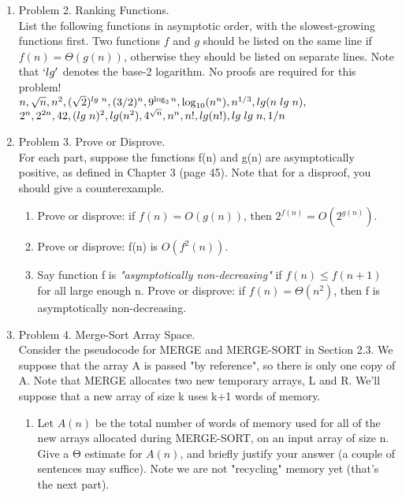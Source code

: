 \documentclass[11pt]{article}
\begin{document}
\begin{enumerate}
\item Problem 2. Ranking Functions.\\
List the following functions in asymptotic order, with the slowest-growing functions first. Two functions $f$ and $g$ should be listed on the same line if $f(n)=Θ(g(n))$, otherwise they should be listed on separate lines. Note that $`lg'$ denotes the base-2 logarithm. No proofs are required for this problem!\\
\hspace{0.5cm}
$n, \sqrt{n}, n^2, (\sqrt2)^{lg \hspace{0.1 cm} n}, (3/2)^{n}, 9^{\log _{3} n}, \log _{10} (n^n), n^{1/3}, lg(n\hspace{0.1 cm} lg\hspace{0.1 cm}n),$ \\$ 2^n, 2^{2n}, 42, (lg \hspace{0.1 cm}n)^2, lg (n^2), 4^{\sqrt{n}}, n^n, n!, lg(n!), lg \hspace{0.1cm}lg\hspace{0.1cm}n, 1/n$


\item Problem 3. Prove or Disprove.\\
For each part, suppose the functions f(n) and g(n) are asymptotically positive, as defined in Chapter 3 (page 45). Note that for a disproof, you should give a counterexample.
    \begin{enumerate}
        \item Prove or disprove: if $f(n)=O(g(n))$, then $2^{f(n)}=O(2^{g(n)})$.
        
        \item Prove or disprove: f(n) is $O(f^2(n))$.

        \item Say function f is \textit{"asymptotically non-decreasing"} if $f(n)≤f(n+1)$ for all large enough n. Prove or disprove: if $f(n)=Θ(n^2)$, then f is asymptotically non-decreasing.
    \end{enumerate}


\item Problem 4. Merge-Sort Array Space.\\
Consider the pseudocode for MERGE and MERGE-SORT in Section 2.3. We suppose that the array A is passed "by reference", so there is only one copy of A. Note that MERGE allocates two new temporary arrays, L and R. We'll suppose that a new array of size k uses k+1 words of memory.
    \begin{enumerate}
        \item Let $A(n)$ be the total number of words of memory used for all of the new arrays allocated during MERGE-SORT, on an input array of size n. Give a Θ estimate for $A(n)$, and briefly justify your answer (a couple of sentences may suffice). Note we are not "recycling" memory yet (that's the next part).


\end{enumerate}
\end{enumerate}
\end{document}
